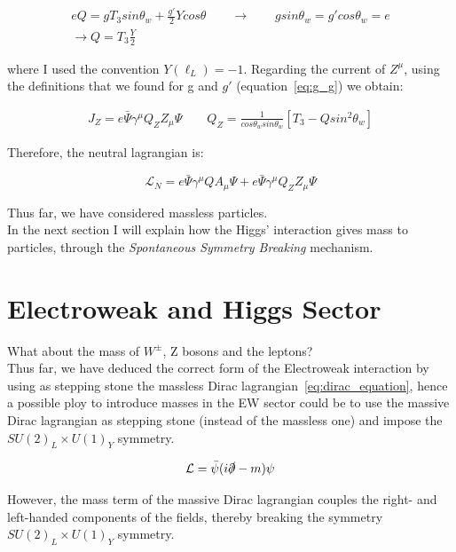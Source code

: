 \begin{align}
\label{eq:g_g}
    eQ = gT_3sin\theta_w + \frac{g'}{2} Y cos\theta
    \qquad
    \rightarrow
    \qquad
    g sin\theta_w = g' cos\theta_w = e\\
    \rightarrow
    Q = T_3 \frac{Y}{2}
\end{align}

where I used the convention $Y(\ell_L)=-1$.
Regarding the current of $Z^{\mu}$, using the definitions that we found for g and $g'$ (equation~\ref{eq:g_g}) 
we obtain:

\begin{align}
    J_Z = e \bar{\Psi} \gamma^{\mu} Q_Z Z_{\mu} \Psi
    \qquad
    Q_Z = \frac{1}{cos\theta_w sin\theta_w}[T_3 - Q sin^2\theta_w]
\end{align}

Therefore, the neutral lagrangian is:

\begin{equation}
    \mathcal{L}_N = e \bar{\Psi} \gamma^{\mu}Q A_{\mu}\Psi + e \bar{\Psi} \gamma^{\mu} Q_Z Z_{\mu} \Psi
\end{equation}

Thus far, we have considered massless particles.\\
In the next section I will explain how the Higgs' interaction gives mass to particles, through the 
\textit{Spontaneous Symmetry Breaking} mechanism.

\section{Electroweak and Higgs Sector}

What about the mass of $W^{\pm}$, Z bosons and the leptons?\\
Thus far, we have deduced the correct form of the Electroweak interaction by using as stepping stone 
the massless Dirac lagrangian~\ref{eq:dirac_equation}, hence a possible ploy to introduce masses in the EW sector
could be to use the massive Dirac lagrangian as stepping stone (instead of the massless one) and impose 
the $SU(2)_L \times U(1)_Y$ symmetry.

\begin{equation}
    \mathcal{L} = \bar{\psi} (i \slashed{\partial} - m) \psi
\end{equation}

However, the mass term of the massive Dirac lagrangian couples the right- and left-handed components of the fields, 
thereby breaking the symmetry $SU(2)_L \times U(1)_Y$ symmetry.

